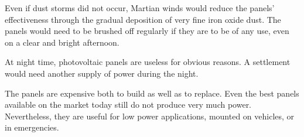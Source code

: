 Even if dust storms did not occur, Martian winds would reduce the panels' effectiveness through the gradual deposition of very fine iron oxide dust. The panels would need to be brushed off regularly if they are to be of any use, even on a clear and bright afternoon.

At night time, photovoltaic panels are useless for obvious reasons. A settlement would need another supply of power during the night.

The panels are expensive both to build as well as to replace. Even the best panels available on the market today still do not produce very much power. Nevertheless, they are useful for low power applications, mounted on vehicles, or in emergencies.

